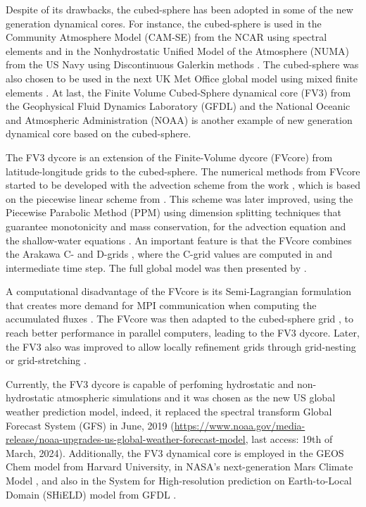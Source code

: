 Despite of its drawbacks, the cubed-sphere has been adopted in some of the new generation
dynamical cores.
For instance, the cubed-sphere is used in the 
Community Atmosphere Model (CAM-SE) from the NCAR using spectral elements \citep{dennis:2012} and in the
Nonhydrostatic Unified Model of the Atmosphere (NUMA) from the US Navy using Discontinuous Galerkin 
methods \citep{giraldo:2013}. The cubed-sphere was also chosen to be used in the next UK Met Office
global model using mixed finite elements \citep{melvin:2022}.
At last, the Finite­ Volume Cubed-Sphere dynamical core (FV3) from the Geophysical Fluid 
Dynamics Laboratory (GFDL) and the National Oceanic and Atmospheric Administration (NOAA)
\citep{putman:2007,harris:2013} is another example
of new generation dynamical core based on the cubed-sphere.

The FV3 dycore is an extension of the Finite-Volume dycore (FVcore)
from latitude-longitude grids to the cubed-sphere.
The numerical methods from FVcore started to be developed with the advection scheme from the work \citet{lin:1994},
which is based on the piecewise linear scheme from \citet{vanleer:1977}. 
This scheme was later improved, using the Piecewise Parabolic Method (PPM) \citep{colella:1984, carpenter:1990}
using dimension splitting techniques that guarantee monotonicity and mass conservation,
for the advection equation \citep{lin:1996} and the shallow-water equations \citep{lin:1997}. 
An important feature is that the FVcore combines the  Arakawa C- and D-grids \citep{arakawa:1977},
where the C-grid values are computed in and intermediate time step. 
The full global model was then presented by \citet{lin:2004}.

A computational disadvantage of the FVcore is its Semi-Lagrangian formulation that creates more demand
for MPI communication when computing the accumulated fluxes \citep{lin:1996}.
The FVcore was then adapted to the cubed-sphere grid \citep{putmanthesis:2007, putman:2007}, 
to reach better performance in parallel computers, leading to the FV3 dycore.
Later, the FV3 also was improved to allow locally refinement grids 
through grid-nesting or grid-stretching \citep{harris:2013}.

Currently, the FV3 dycore is capable of perfoming hydrostatic and non-hydrostatic atmospheric simulations 
and it was chosen as the new US global weather prediction model, indeed, it replaced the spectral transform
Global Forecast System (GFS) in June, 2019
(\url{https://www.noaa.gov/media-release/noaa-upgrades-us-global-weather-forecast-model}, last access: 19th of March, 2024).
Additionally, the FV3 dynamical core is employed in the GEOS Chem model \citep{martin:2022} from Harvard University, 
in NASA’s next-generation Mars Climate Model \citep{wilson:2022}, 
and also in the System for High-resolution prediction on Earth-to-Local Domain (SHiELD) model from GFDL \citep{harris:2020}.

